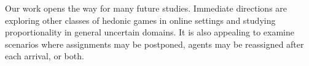 \documentclass[letterpaper]{article} %
\begin{document}
Our work opens the way for many future studies. Immediate directions are exploring other classes of hedonic games in online settings and studying proportionality in general uncertain domains. It is also appealing to examine scenarios where assignments may be postponed, agents may be reassigned after each arrival, or both.



\end{document}
